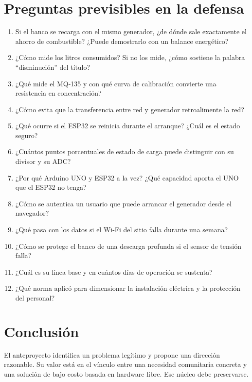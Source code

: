 \documentclass[11pt,a4paper]{article}
\begin{document}
\section{Preguntas previsibles en la defensa}

\begin{enumerate}[leftmargin=1.5em, itemsep=3pt]
  \item Si el banco se recarga con el mismo generador, ¿de dónde sale exactamente el ahorro de combustible? ¿Puede demostrarlo con un balance energético?
  \item ¿Cómo mide los litros consumidos? Si no los mide, ¿cómo sostiene la palabra ``disminución'' del título?
  \item ¿Qué mide el MQ-135 y con qué curva de calibración convierte una resistencia en concentración?
  \item ¿Cómo evita que la transferencia entre red y generador retroalimente la red?
  \item ¿Qué ocurre si el ESP32 se reinicia durante el arranque? ¿Cuál es el estado seguro?
  \item ¿Cuántos puntos porcentuales de estado de carga puede distinguir con su divisor y su ADC?
  \item ¿Por qué Arduino UNO y ESP32 a la vez? ¿Qué capacidad aporta el UNO que el ESP32 no tenga?
  \item ¿Cómo se autentica un usuario que puede arrancar el generador desde el navegador?
  \item ¿Qué pasa con los datos si el Wi-Fi del sitio falla durante una semana?
  \item ¿Cómo se protege el banco de una descarga profunda si el sensor de tensión falla?
  \item ¿Cuál es su línea base y en cuántos días de operación se sustenta?
  \item ¿Qué norma aplicó para dimensionar la instalación eléctrica y la protección del personal?
\end{enumerate}

\section{Conclusión}

El anteproyecto identifica un problema legítimo y propone una dirección razonable. Su valor está en el vínculo entre una necesidad comunitaria concreta y una solución de bajo costo basada en hardware libre. Ese núcleo debe preservarse.
\end{document}
